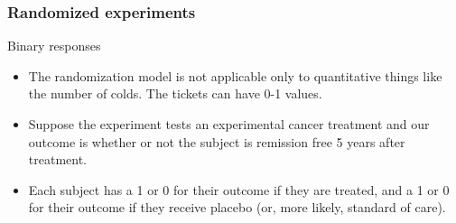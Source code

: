 \documentclass[handout]{beamer}
\begin{document}

   \begin{frame} \frametitle{Randomized experiments}

   \begin{block}
   {Binary responses}
   \begin{itemize}
   \item The randomization model is not applicable only to
   quantitative things like the number of colds. The tickets
   can have 0-1 values.

   \item Suppose the experiment tests an experimental cancer treatment
   and our outcome is whether or not the subject is remission free 5 years
   after treatment.

   \item Each subject has a {\color{green} 1 or 0} for their
   outcome if they are treated, and a {\color{red} 1 or 0} for their
   outcome if they receive placebo (or, more likely, standard of care).

   \end{itemize}
   \end{block}
   \end{frame}

\end{document}
